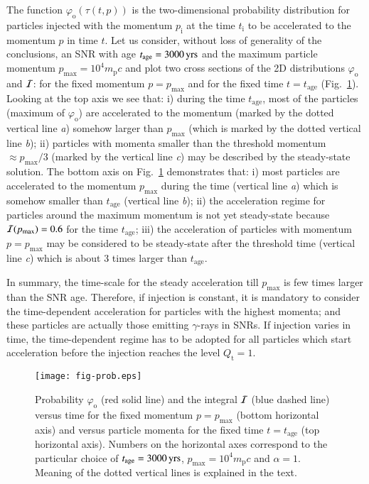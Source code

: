 \documentclass{aa}
\newcommand\un[1]{{\,\rm #1}}
\newcommand\rs[1]{_\mathrm{#1}}
\begin{document}
The function $\varphi\rs{o}(\tau(t,p))$ is the two-dimensional probability distribution for particles injected with the momentum $p\rs{i}$ at the time $t\rs{i}$ to be accelerated to the momentum $p$ in time $t$. Let us consider, without loss of generality of the conclusions, an SNR with age $t\rs{age}=3000\un{yrs}$ and the maximum particle momentum $p\rs{max}=10^{4}m\rs{p}c$ and plot two cross sections of the 2D distributions $\varphi\rs{o}$ and ${\cal I}$: for the fixed momentum $p=p\rs{max}$ and for the fixed time $t=t\rs{age}$  (Fig.~\ref{alpha:figprob}). Looking at the top axis we see that: i) during the time $t\rs{age}$, most of the particles (maximum of $\varphi\rs{o}$) are accelerated to the momentum (marked by the dotted vertical line {\it a}) somehow larger than $p\rs{max}$ (which is marked by the dotted vertical line {\it b}); ii) particles with momenta smaller than the threshold momentum $\approx p\rs{max}/3$ (marked by the vertical line {\it c}) may be described by the steady-state solution. The bottom axis on Fig.~\ref{alpha:figprob} demonstrates that: i) most particles are accelerated to the momentum $p\rs{max}$ during the time (vertical line {\it a}) which is somehow smaller than $t\rs{age}$ (vertical line {\it b}); ii) the acceleration regime for particles around the maximum momentum is not yet steady-state because ${\cal I}(p\rs{max})=0.6$ for the time $t\rs{age}$; iii) the acceleration of particles with momentum $p=p\rs{max}$ may be considered to be steady-state after the threshold time (vertical line {\it c}) which is about 3 times larger than $t\rs{age}$. 

In summary, the time-scale for the steady acceleration till $p\rs{max}$ is few times larger than the SNR age. Therefore, if injection is constant, it is mandatory to consider the time-dependent acceleration for particles with the highest momenta; and these particles are actually those emitting $\gamma$-rays in SNRs. If injection varies in time, the time-dependent regime has to be adopted for all particles which start acceleration before the injection reaches the level $Q\rs{t}=1$.

\begin{figure}
 \centering
 \texttt{[image: fig-prob.eps]}
 \caption{Probability $\varphi\rs{o}$ (red solid line) and the integral ${\cal I}$ (blue dashed line) versus time for the fixed momentum $p=p\rs{max}$ (bottom horizontal axis) and versus particle momenta for the fixed time $t=t\rs{age}$ (top horizontal axis). Numbers on the horizontal axes correspond to the particular choice of $t\rs{age}=3000\un{yrs}$,  $p\rs{max}=10^{4}m\rs{p}c$ and $\alpha=1$. Meaning of the dotted vertical lines is explained in the text.
               }
 \label{alpha:figprob}
\end{figure}
\end{document}
